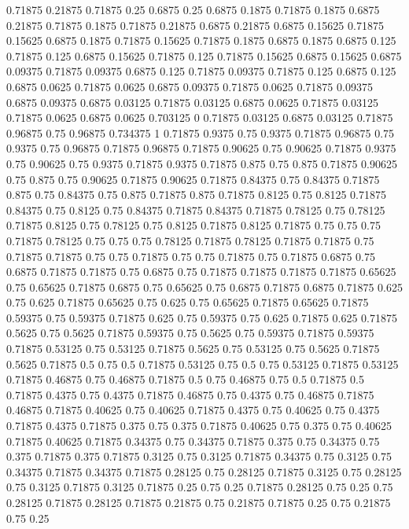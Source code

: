 0.71875 0.21875
0.71875 0.25
0.6875 0.25
0.6875 0.1875
0.71875 0.1875
0.6875 0.21875
0.71875 0.1875
0.71875 0.21875
0.6875 0.21875
0.6875 0.15625
0.71875 0.15625
0.6875 0.1875
0.71875 0.15625
0.71875 0.1875
0.6875 0.1875
0.6875 0.125
0.71875 0.125
0.6875 0.15625
0.71875 0.125
0.71875 0.15625
0.6875 0.15625
0.6875 0.09375
0.71875 0.09375
0.6875 0.125
0.71875 0.09375
0.71875 0.125
0.6875 0.125
0.6875 0.0625
0.71875 0.0625
0.6875 0.09375
0.71875 0.0625
0.71875 0.09375
0.6875 0.09375
0.6875 0.03125
0.71875 0.03125
0.6875 0.0625
0.71875 0.03125
0.71875 0.0625
0.6875 0.0625
0.703125 0
0.71875 0.03125
0.6875 0.03125
0.71875 0.96875
0.75 0.96875
0.734375 1
0.71875 0.9375
0.75 0.9375
0.71875 0.96875
0.75 0.9375
0.75 0.96875
0.71875 0.96875
0.71875 0.90625
0.75 0.90625
0.71875 0.9375
0.75 0.90625
0.75 0.9375
0.71875 0.9375
0.71875 0.875
0.75 0.875
0.71875 0.90625
0.75 0.875
0.75 0.90625
0.71875 0.90625
0.71875 0.84375
0.75 0.84375
0.71875 0.875
0.75 0.84375
0.75 0.875
0.71875 0.875
0.71875 0.8125
0.75 0.8125
0.71875 0.84375
0.75 0.8125
0.75 0.84375
0.71875 0.84375
0.71875 0.78125
0.75 0.78125
0.71875 0.8125
0.75 0.78125
0.75 0.8125
0.71875 0.8125
0.71875 0.75
0.75 0.75
0.71875 0.78125
0.75 0.75
0.75 0.78125
0.71875 0.78125
0.71875 0.71875
0.75 0.71875
0.71875 0.75
0.75 0.71875
0.75 0.75
0.71875 0.75
0.71875 0.6875
0.75 0.6875
0.71875 0.71875
0.75 0.6875
0.75 0.71875
0.71875 0.71875
0.71875 0.65625
0.75 0.65625
0.71875 0.6875
0.75 0.65625
0.75 0.6875
0.71875 0.6875
0.71875 0.625
0.75 0.625
0.71875 0.65625
0.75 0.625
0.75 0.65625
0.71875 0.65625
0.71875 0.59375
0.75 0.59375
0.71875 0.625
0.75 0.59375
0.75 0.625
0.71875 0.625
0.71875 0.5625
0.75 0.5625
0.71875 0.59375
0.75 0.5625
0.75 0.59375
0.71875 0.59375
0.71875 0.53125
0.75 0.53125
0.71875 0.5625
0.75 0.53125
0.75 0.5625
0.71875 0.5625
0.71875 0.5
0.75 0.5
0.71875 0.53125
0.75 0.5
0.75 0.53125
0.71875 0.53125
0.71875 0.46875
0.75 0.46875
0.71875 0.5
0.75 0.46875
0.75 0.5
0.71875 0.5
0.71875 0.4375
0.75 0.4375
0.71875 0.46875
0.75 0.4375
0.75 0.46875
0.71875 0.46875
0.71875 0.40625
0.75 0.40625
0.71875 0.4375
0.75 0.40625
0.75 0.4375
0.71875 0.4375
0.71875 0.375
0.75 0.375
0.71875 0.40625
0.75 0.375
0.75 0.40625
0.71875 0.40625
0.71875 0.34375
0.75 0.34375
0.71875 0.375
0.75 0.34375
0.75 0.375
0.71875 0.375
0.71875 0.3125
0.75 0.3125
0.71875 0.34375
0.75 0.3125
0.75 0.34375
0.71875 0.34375
0.71875 0.28125
0.75 0.28125
0.71875 0.3125
0.75 0.28125
0.75 0.3125
0.71875 0.3125
0.71875 0.25
0.75 0.25
0.71875 0.28125
0.75 0.25
0.75 0.28125
0.71875 0.28125
0.71875 0.21875
0.75 0.21875
0.71875 0.25
0.75 0.21875
0.75 0.25
